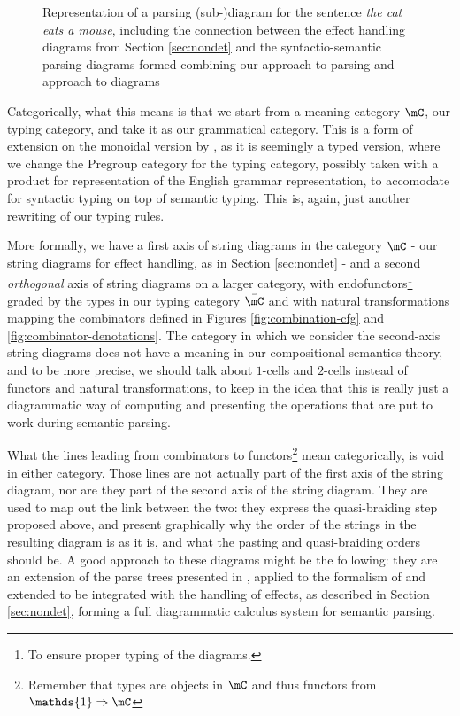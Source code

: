 \begin{figure}
	\centering
  \caption{Representation of a parsing (sub-)diagram for the sentence 
    \emph{the cat eats a mouse}, including the connection between the effect
    handling diagrams from Section \ref{sec:nondet} and the syntactio-semantic
    parsing diagrams formed combining our approach to parsing and
  \cite{coeckeMathematicalFoundationsCompositional2010} approach to diagrams}
  \label{fig:parsing-diagram}
\end{figure}

Categorically, what this means is that we start from a meaning category $\mC$,
our typing category, and take it as our grammatical category.
This is a form of extension on the monoidal version by
, as it is seemingly a
typed version, where we change the Pregroup category for the typing category,
possibly taken with a product for representation of the English grammar
representation, to accomodate for syntactic typing on top of semantic typing.
This is, again, just another rewriting of our typing rules.

More formally, we have a first axis of string diagrams in the category
$\mC$ - our string diagrams for effect handling, as in Section
\ref{sec:nondet} - and a second \emph{orthogonal} axis of string diagrams
on a larger category, with endofunctors\footnote{To ensure proper typing of the
	diagrams.} graded by the types in our typing category $\bar{\mC}$ and
with natural transformations mapping the combinators defined in Figures
\ref{fig:combination-cfg} and \ref{fig:combinator-denotations}.
The category in which we consider the second-axis string diagrams does not have
a meaning in our compositional semantics theory, and to be more precise, we
should talk about $1$-cells and $2$-cells instead of functors and natural
transformations, to keep in the idea that this is really just a diagrammatic
way of computing and presenting the operations that are put to work during
semantic parsing.

\medskip

What the lines leading from combinators to functors\footnote{Remember that
	types are objects in $\mC$ and thus functors from
	$\mathds{1} \Rightarrow \mC$} mean categorically, is void in either category.
Those lines are not actually part of the first axis of the string diagram,
nor are they part of the second axis of the string diagram.
They are used to map out the link between the two: they express the
quasi-braiding step proposed above, and present graphically why the order of
the strings in the resulting diagram is as it is, and what the pasting and
quasi-braiding orders should be.
A good approach to these diagrams might be the following: they are an extension
of the parse trees presented in
, applied to the
formalism of  and
extended to be integrated with the handling of effects,
as described in Section \ref{sec:nondet}, forming a full diagrammatic calculus
system for semantic parsing.

